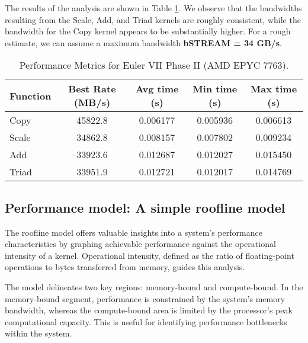 \documentclass[unicode,11pt,a4paper,oneside,numbers=endperiod,openany]{scrartcl}
\begin{document}
The results of the analysis are shown in Table \ref{tab:performance_II}.
We observe that the bandwidths resulting from the Scale, Add, and Triad kernels are roughly
consistent, while the bandwidth for the Copy kernel appears to be substantially higher. 
For a rough estimate, we can assume a maximum bandwidth \textbf{bSTREAM = 34 GB/s}.
\begin{table}[htbp]
    \centering
    \caption{Performance Metrics for Euler VII Phase II (AMD EPYC 7763).}
    \begin{tabular}{||lcccc||}
        \hline
        Function & Best Rate (MB/s) & Avg time (s) & Min time (s) & Max time (s)\\
        \hline
        \hline
        Copy    & 45822.8 & 0.006177 & 0.005936 & 0.006613 \\
        \hline
        Scale   & 34862.8 & 0.008157 & 0.007802 & 0.009234 \\
        \hline
        Add     & 33923.6 & 0.012687 & 0.012027 & 0.015450 \\
        \hline
        Triad   & 33951.9 & 0.012721 & 0.012017 & 0.014769 \\
        \hline
    \end{tabular}
    \label{tab:performance_II}
\end{table}

\subsection{Performance model: A simple roofline model}
The roofline model offers valuable insights into a system's performance characteristics by graphing achievable
performance against the operational intensity of a kernel. Operational intensity, defined as the
ratio of floating-point operations to bytes transferred from memory, guides this analysis.

The model delineates two key regions: memory-bound and compute-bound. In the memory-bound segment,
performance is constrained by the system's memory bandwidth, whereas the compute-bound area is
limited by the processor's peak computational capacity. This is useful for identifying performance
bottlenecks within the system.
\end{document}
